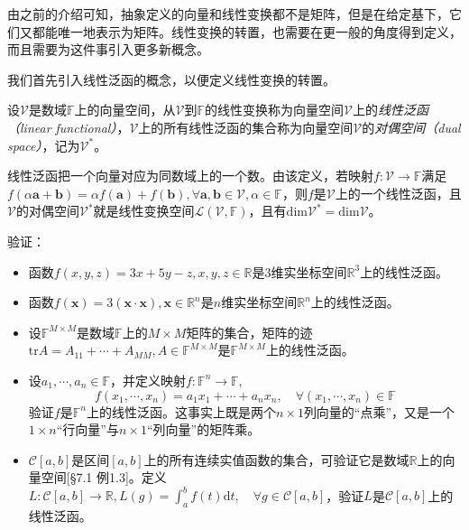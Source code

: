 \documentclass[main.tex]{subfiles}
\begin{document}
由之前的介绍可知，抽象定义的向量和线性变换都不是矩阵，但是在给定基下，它们又都能唯一地表示为矩阵。线性变换的转置，也需要在更一般的角度得到定义，而且需要为这件事引入更多新概念。

我们首先引入线性泛函的概念，以便定义线性变换的转置。

\begin{definition}[线性泛函与对偶空间]\label{def:II.2.14}
    设$\mathcal{V}$是数域$\mathbb{F}$上的向量空间，从$\mathcal{V}$到$\mathbb{F}$的线性变换称为向量空间$\mathcal{V}$上的\emph{线性泛函（linear functional）}，$\mathcal{V}$上的所有线性泛函的集合称为向量空间$\mathcal{V}$的\emph{对偶空间（dual space）}，记为$\mathcal{V}^*$。
\end{definition}

线性泛函把一个向量对应为同数域上的一个数。由该定义，若映射$f:\mathcal{V}\rightarrow\mathbb{F}$满足$f\left(\alpha\mathbf{a}+\mathbf{b}\right)=\alpha f\left(\mathbf{a}\right)+f\left(\mathbf{b}\right),\forall\mathbf{a},\mathbf{b}\in\mathcal{V},\alpha\in\mathbb{F}$，则$f$是$\mathcal{V}$上的一个线性泛函，且$\mathcal{V}$的对偶空间$\mathcal{V}^*$就是线性变换空间$\mathcal{L}\left(\mathcal{V},\mathbb{F}\right)$，且有$\mathrm{dim}\mathcal{V}^*=\mathrm{dim}\mathcal{V}$。

\begin{example}\label{exp:II.2.11}
    验证：
    \begin{itemize}
        \item 函数$f\left(x,y,z\right)=3x+5y-z,x,y,z\in\mathbb{R}$是3维实坐标空间$\mathbb{R}^3$上的线性泛函。
        \item 函数$f\left(\mathbf{x}\right)=3\left(\mathbf{x}\cdot\mathbf{x}\right),\mathbf{x}\in\mathbb{R}^n$是$n$维实坐标空间$\mathbb{R}^n$上的线性泛函。
        \item 设$\mathbb{F}^{M\times M}$是数域$\mathbb{F}$上的$M\times M$矩阵的集合，矩阵的迹$\mathrm{tr}A=A_{11}+\cdots+A_{MM},A\in\mathbb{F}^{M\times M}$是$\mathbb{F}^{M\times M}$上的线性泛函。
        \item 设$a_1,\cdots,a_n\in\mathbb{F}$，并定义映射$f:\mathbb{F}^n\rightarrow\mathbb{F},$
              \[f\left(x_1,\cdots,x_n\right)=a_1x_1+\cdots+a_nx_n,\quad\forall\left(x_1,\cdots,x_n\right)\in\mathbb{F}\]
              验证$f$是$\mathbb{F}^n$上的线性泛函。这事实上既是两个$n\times 1$列向量的“点乘”，又是一个$1\times n$“行向量”与$n\times 1$“列向量”的矩阵乘。
        \item $\mathcal{C}\left[a,b\right]$是区间$\left[a,b\right]$上的所有连续实值函数的集合，可验证它是数域$\mathbb{R}$上的向量空间\cite{周胜林2012线性代数}[\S 7.1 例1.3]。定义$L:\mathcal{C}\left[a,b\right]\rightarrow\mathbb{R},L\left(g\right)=\int_a^bf\left(t\right)\mathrm{d}t,\quad\forall g\in\mathcal{C}\left[a,b\right]$，验证$L$是$\mathcal{C}\left[a,b\right]$上的线性泛函。
    \end{itemize}
\end{example}
\end{document}
